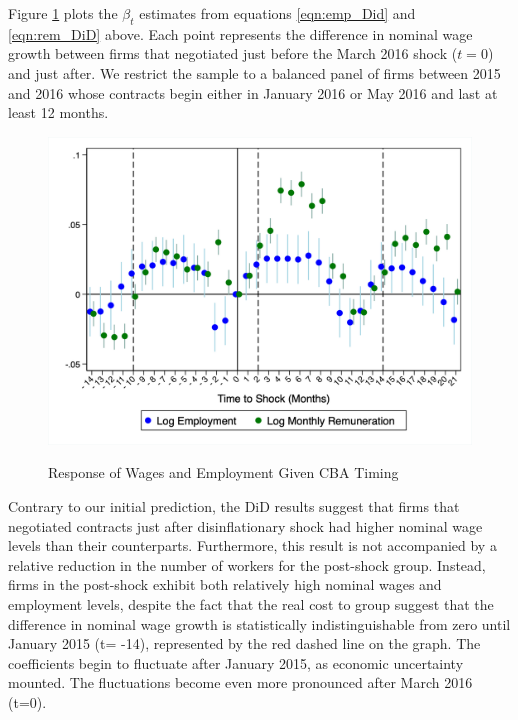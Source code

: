 \documentclass[12pt]{article}
\begin{document}
		Figure \ref{fig:RegressionResults} plots the $\beta_t$ estimates from equations \ref{eqn:emp_Did} and \ref{eqn:rem_DiD} above. Each point represents the difference in nominal wage growth between firms that negotiated just before the March 2016 shock ($t=0$) and just after. We restrict the sample to a balanced panel of firms between 2015 and 2016 whose contracts begin either in January 2016 or May 2016 and last at least 12 months.
		\begin{figure}[!ht]
			\centering
			\caption{Response of Wages and Employment Given CBA Timing}
			\includegraphics[scale = .49]{tables-figures/DiD_Plots_Weighted_Employment_Rem.png}
			\label{fig:RegressionResults}
		\end{figure}
		Contrary to our initial prediction, the DiD results suggest that firms that negotiated contracts just after disinflationary shock had higher nominal wage levels than their counterparts. Furthermore, this result is not accompanied by a relative reduction in the number of workers for the post-shock group. Instead, firms in the post-shock exhibit both relatively high nominal wages and employment levels, despite the fact that the real cost to group suggest that the difference in nominal wage growth is statistically indistinguishable from zero until January 2015 (t= -14), represented by the red dashed line on the graph. The coefficients begin to fluctuate after January 2015, as economic uncertainty mounted. The fluctuations become even more pronounced after March 2016 (t=0).
\end{document}
